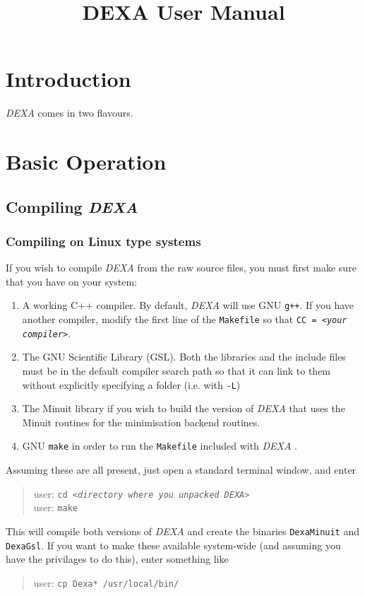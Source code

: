\documentclass[a4paper,12pt]{report}
\title{DEXA User Manual}
\newcommand{\dexa}{\emph{DEXA} }
\begin{document}
\maketitle 
\tableofcontents
\chapter{Introduction}
\dexa comes in two flavours. 

\chapter{Basic Operation}
\section{Compiling \dexa}
\subsection{Compiling on Linux type systems}
If you wish to compile \dexa from the raw source files, you must first make sure that you have on your system:

\begin{enumerate}
\item A working C++ compiler. By default, \dexa will use GNU \verb|g++|. If you have another compiler, modify the first line of the \verb|Makefile| so that \texttt{CC~=~\emph{<your compiler>}}.

\item The GNU Scientific Library (GSL). Both the libraries and the include files must be in the default compiler search path so that it can link to them without explicitly specifying a folder (i.e. with \verb|-L|)

\item The Minuit library if you wish to build the version of \dexa that uses the Minuit routines for the minimisation backend routines.

\item GNU \verb|make| in order to run the \verb|Makefile| included with \dexa.
\end{enumerate}

Assuming these are all present, just open a standard terminal window, and enter
\begin{quote}
  user\@@host: \texttt{cd \emph{<directory where you unpacked DEXA>}}\\
  user\@@host: \verb|make|
\end{quote}
This will compile both versions of \dexa and create the binaries \verb|DexaMinuit| and \verb|DexaGsl|. If you want to make these available system-wide (and assuming you have the privilages to do this), enter something like
\begin{quote}
  user\@@host: \verb|cp Dexa* /usr/local/bin/|
\end{quote}
\end{document}
